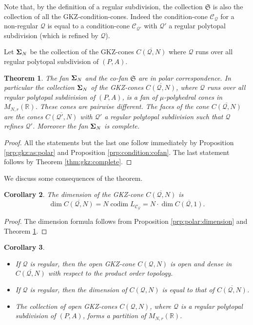 \documentclass[12pt, a4article]{amsart}   	%
\numberwithin{equation}{section}
\theoremstyle{plain}
\newtheorem{theorem}{Theorem}[section]
\newtheorem{corollary}[theorem]{Corollary}
\theoremstyle{definition}
\newcommand{\R}{{\mathbb R}}
\newcommand{\bfSigma}{{\bf \Sigma}}
\newcommand{\mcC}{{\mathcal C}}
\newcommand{\mcQ}{{\mathcal Q}}
\newcommand{\mfS}{{\mathfrak S}}
\newcommand{\MNaR}{M_{N,r}(\R)}
\DeclareMathOperator{\codim}{codim}
\begin{document}
Note that, by the definition of a regular subdivision, the collection $\mfS$ is also the collection of all the GKZ-condition-cones. Indeed the condition-cone $\mcC_\mcQ$ for a non-regular $\mcQ$ is equal to a condition-cone $\mcC_{\mcQ'}$ with $\mcQ'$ a regular polytopal subdivision (which is refined by $\mcQ$).

Let $\bfSigma_N$ be the collection of the GKZ-cones $\overline{C(\mcQ,N)}$ where $\mcQ$ runs over all regular polytopal subdivision of $(P,A)$.

\begin{theorem}\label{thm:gkz:correspondence}
    The fan $\bfSigma_N$ and the co-fan $\mfS$ are in polar correspondence. In particular the collection $\bfSigma_N$ of the GKZ-cones $\overline{C(\mcQ,N)}$, where $\mcQ$ runs over all regular polytopal subdivision of $(P,A)$, is a fan of $\mu$-polyhedral cones in $\MNaR$. These cones are pairwise different. The faces of the cone $\overline{C(\mcQ,N)}$ are the cones $\overline{C(\mcQ',N)}$ with $\mcQ'$ a regular polytopal subdivision such that $\mcQ$ refines $\mcQ'$. Moreover the fan $\bfSigma_N$ is complete.
\end{theorem}

\begin{proof} 
All the statements but the last one follow immediately by Proposition \ref{prp:gkz:as:polar} and Proposition \ref{prp:condition:cofan}. The last statement follows by Theorem \ref{thm:gkz:complete}.
\end{proof}

We discuss some consequences of the theorem.

\begin{corollary}\label{cor:gkz:dimension}
The dimension of the GKZ-cone $\overline{C(\mcQ,N)}$ is 
$$\dim\overline{C(\mcQ,N)} = N\codim L_{\mcC_\mcQ}=N\cdot \dim \overline{C(\mcQ,1)}.$$
\end{corollary}

\begin{proof} 
The dimension formula follows from Proposition \ref{prp:polar:dimension} and Theorem \ref{thm:gkz:correspondence}.
\end{proof}

\begin{corollary}\label{cor:open:partition}
\begin{itemize}
\item[\rm (i)] If $\mcQ$ is regular, then the open GKZ-cone $C(\mcQ,N)$ is open and dense in $\overline{C(\mcQ,N)}$ with respect to the product order topology.
\item[\rm (ii)] If $\mcQ$ is regular, then the dimension of $C(\mcQ,N)$ is equal to that of $\overline{C(\mcQ,N)}$.
\item[\rm (iii)] The collection of open GKZ-cones $C(\mcQ,N)$, where $\mcQ$ is a regular polytopal subdivision of $(P,A)$, forms a partition of $M_{N,r}(\mathbb{R})$.
\end{itemize}
\end{corollary}
\end{document}

